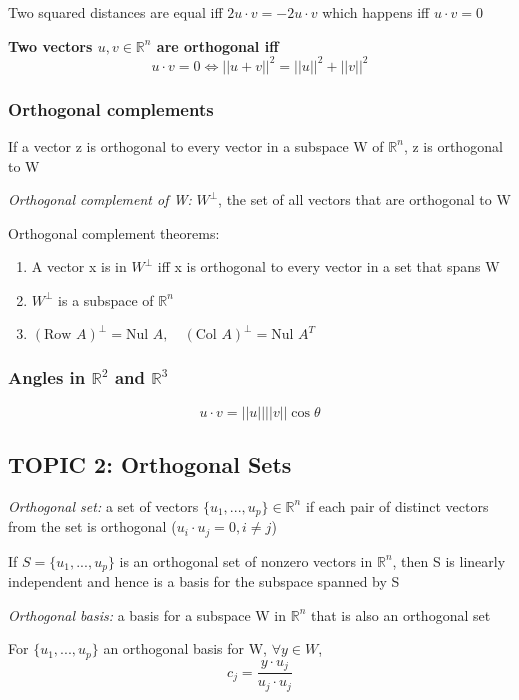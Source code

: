 \documentclass[12pt]{article} %
\newcommand{\R}{\mathbb{R}}
\begin{document}
Two squared distances are equal iff $2 u \cdot v = -2 u \cdot v$ which happens iff $u\cdot v = 0$

\textbf{Two vectors $u, v \in \R^n$ are orthogonal iff $$u \cdot v = 0 \iff ||u + v||^2 = ||u||^2 + ||v||^2$$}

\subsubsection{Orthogonal complements}
If a vector z is orthogonal to every vector in a subspace W of $\R^n$, z is orthogonal to W

\emph{Orthogonal complement of W:} $W^\perp$, the set of all vectors that are orthogonal to W

Orthogonal complement theorems:
\begin{enumerate}
	\item A vector x is in $W^\perp$ iff x is orthogonal to every vector in a set that spans W
	\item $W^\perp$ is a subspace of $\R^n$
	\item $(\text{Row }A)^\perp = \text{Nul }A, \quad (\text{Col } A)^\perp = \text{Nul }A^T$
\end{enumerate}

\subsubsection{Angles in $\R^2$ and $\R^3$}
$$u\cdot v = ||u|| ||v|| \cos\theta$$

\subsection{TOPIC 2: Orthogonal Sets}
\emph{Orthogonal set:} a set of vectors $\{u_1, ..., u_p\} \in \R^n$ if each pair of distinct vectors from the set is orthogonal ($u_i \cdot u_j = 0,  i \neq j$) 

If $S = \{u_1, ..., u_p\}$ is an orthogonal set of nonzero vectors in $\R^n$, then S is linearly independent and hence is a basis for the subspace spanned by S

\emph{Orthogonal basis:} a basis for a subspace W in $\R^n$ that is also an orthogonal set

For $\{u_1, ..., u_p\}$ an orthogonal basis for W, $\forall y \in W$, 
$$c_j = \frac{y \cdot u_j}{u_j \cdot u_j}$$
\end{document}
